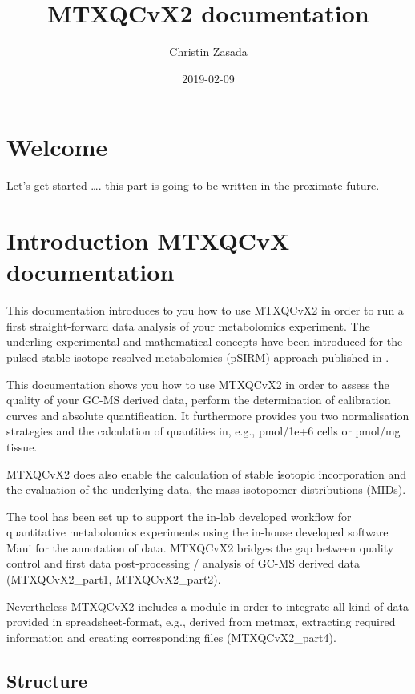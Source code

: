 \documentclass[]{book}
\title{MTXQCvX2 documentation}
\author{Christin Zasada}
\date{2019-02-09}
\theoremstyle{definition}
\theoremstyle{definition}
\theoremstyle{definition}
\theoremstyle{remark}
\begin{document}
\maketitle

{
\setcounter{tocdepth}{1}
\tableofcontents
}
\chapter{Welcome}\label{welcome}

Let's get started \ldots{}. this part is going to be written in the
proximate future.

\chapter{Introduction MTXQCvX documentation}\label{intro}

This documentation introduces to you how to use MTXQCvX2 in order to run
a first straight-forward data analysis of your metabolomics experiment.
The underling experimental and mathematical concepts have been
introduced for the pulsed stable isotope resolved metabolomics (pSIRM)
approach published in \citep{Pietzke2014}.

This documentation shows you how to use MTXQCvX2 in order to assess the
quality of your GC-MS derived data, perform the determination of
calibration curves and absolute quantification. It furthermore provides
you two normalisation strategies and the calculation of quantities in,
e.g., pmol/1e+6 cells or pmol/mg tissue.

MTXQCvX2 does also enable the calculation of stable isotopic
incorporation and the evaluation of the underlying data, the mass
isotopomer distributions (MIDs).

The tool has been set up to support the in-lab developed workflow for
quantitative metabolomics experiments using the in-house developed
software Maui for the annotation of data. MTXQCvX2 bridges the gap
between quality control and first data post-processing / analysis of
GC-MS derived data (MTXQCvX2\_part1, MTXQCvX2\_part2).

Nevertheless MTXQCvX2 includes a module in order to integrate all kind
of data provided in spreadsheet-format, e.g., derived from metmax,
extracting required information and creating corresponding files
(MTXQCvX2\_part4).

\section{Structure}\label{structure}
\end{document}
